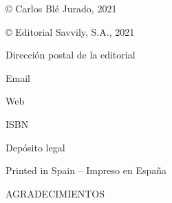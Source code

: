 \documentclass{article}
\begin{document}
\begin{titlepage}\thispagestyle{empty}
  \vspace*{\fill}
  {\normalsize\centering © Carlos Blé Jurado, 2021 \par}
  \vspace*{0.15cm}
  {\normalsize\centering © Editorial Savvily, S.A., 2021 \par}
  \vspace*{0.15cm}
  {\normalsize\centering Dirección postal de la editorial \par}
  \vspace*{0.15cm}
  {\normalsize\centering Email \par}
  \vspace*{0.15cm}
  {\normalsize\centering Web \par}
  \vspace*{0.75cm}
  {\normalsize\centering ISBN \par}
  {\normalsize\centering Depósito legal \par}
  \vspace*{0.75cm}
  {\normalsize\centering Printed in Spain – Impreso en España\par}
\end{titlepage}

\newpage\phantom{blabla}\thispagestyle{empty}

\begin{titlepage}\thispagestyle{empty}
  {\scshape\Huge AGRADECIMIENTOS \par}
\end{titlepage}

\newpage\phantom{blabla}\thispagestyle{empty}
\end{document}
